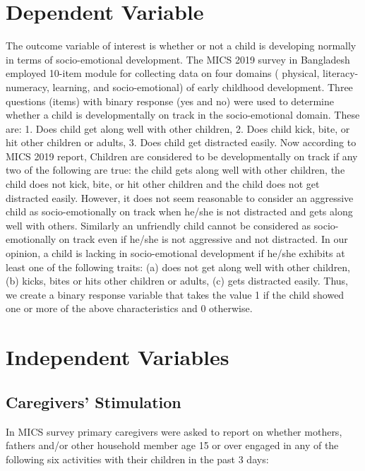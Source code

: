 \documentclass[
  12pt,
  oneside]{report}
\begin{document}
\hypertarget{dependent-variable}{%
\section{Dependent Variable}\label{dependent-variable}}

The outcome variable of interest is whether or not a child is developing normally in terms of socio-emotional development. The MICS 2019 survey in Bangladesh employed 10-item module for collecting data on four domains ( physical, literacy-numeracy, learning, and socio-emotional) of early childhood development. Three questions (items) with binary response (yes and no) were used to determine whether a child is developmentally on track in the socio-emotional domain. These are: 1. Does child get along well with other children, 2. Does child kick, bite, or hit other children or adults, 3. Does child get distracted easily. Now according to MICS 2019 report, Children are considered to be developmentally on track if any two of the following are true: the child gets along well with other children, the child does not kick, bite, or hit other children and the child does not get distracted easily. However, it does not seem reasonable to consider an aggressive child as socio-emotionally on track when he/she is not distracted and gets along well with others. Similarly an unfriendly child cannot be considered as socio-emotionally on track even if he/she is not aggressive and not distracted. In our opinion, a child is lacking in socio-emotional development if he/she exhibits at least one of the following traits: (a) does not get along well with other children, (b) kicks, bites or hits other children or adults, (c) gets distracted easily. Thus, we create a binary response variable that takes the value 1 if the child showed one or more of the above characteristics and 0 otherwise.

\hypertarget{independent-variables}{%
\section{Independent Variables}\label{independent-variables}}

\hypertarget{caregivers-stimulation}{%
\subsection{Caregivers' Stimulation}\label{caregivers-stimulation}}

In MICS survey primary caregivers were asked to report on whether mothers, fathers and/or other household member age 15 or over engaged in any of the following six activities with their children in the past 3 days:
\end{document}
